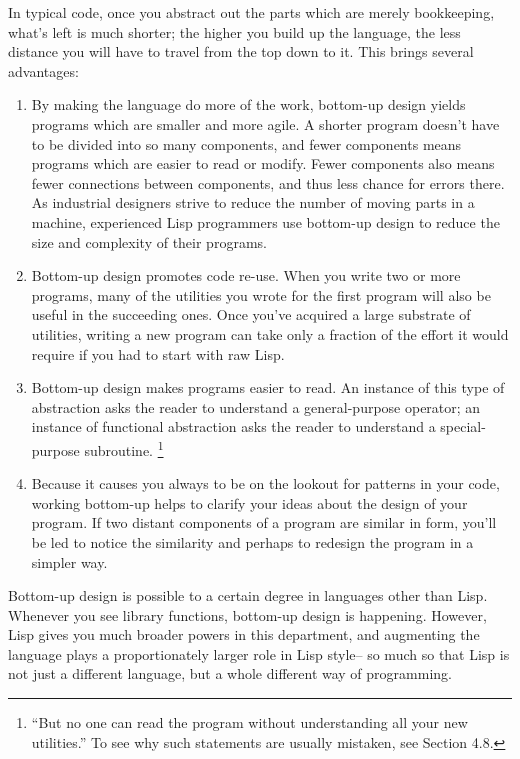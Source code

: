 In typical code, once you abstract out the parts which are merely
bookkeeping, what's left is much shorter; the higher you build up the
language, the less distance you will have to travel from the top down to
it. This brings several advantages:

\begin{enumerate}
\def\labelenumi{\arabic{enumi}.}
\item
  By making the language do more of the work, bottom-up design yields
  programs which are smaller and more agile. A shorter program doesn't
  have to be divided into so many components, and fewer components means
  programs which are easier to read or modify. Fewer components also
  means fewer connections between components, and thus less chance for
  errors there. As industrial designers strive to reduce the number of
  moving parts in a machine, experienced Lisp programmers use bottom-up
  design to reduce the size and complexity of their programs.
\item
  Bottom-up design promotes code re-use. When you write two or more
  programs, many of the utilities you wrote for the first program will
  also be useful in the succeeding ones. Once you've acquired a large
  substrate of utilities, writing a new program can take only a fraction
  of the effort it would require if you had to start with raw Lisp.
\item
  Bottom-up design makes programs easier to read. An instance of this
  type of abstraction asks the reader to understand a general-purpose
  operator; an instance of functional abstraction asks the reader to
  understand a special-purpose subroutine. \footnote{``But no one can read the program without understanding all your
new utilities.'' To see why such statements are usually mistaken, see
Section 4.8.}
\item
  Because it causes you always to be on the lookout for patterns in your
  code, working bottom-up helps to clarify your ideas about the design
  of your program. If two distant components of a program are similar in
  form, you'll be led to notice the similarity and perhaps to redesign
  the program in a simpler way.
\end{enumerate}

Bottom-up design is possible to a certain degree in languages other than
Lisp. Whenever you see library functions, bottom-up design is happening.
However, Lisp gives you much broader powers in this department, and
augmenting the language plays a proportionately larger role in Lisp
style-- so much so that Lisp is not just a different language, but a
whole different way of programming.

